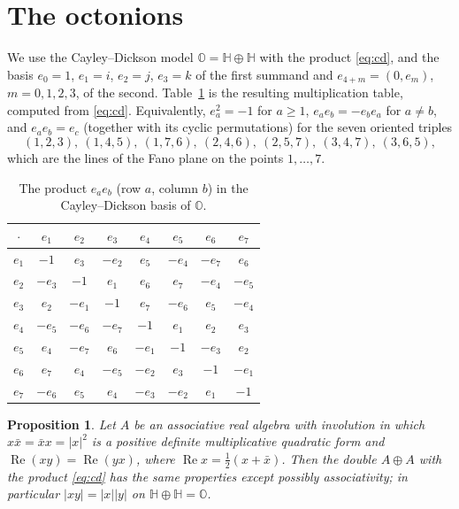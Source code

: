\documentclass[11pt]{amsart}
\numberwithin{equation}{section}
\theoremstyle{plain}
\newtheorem{proposition}[theorem]{Proposition}
\theoremstyle{definition}
\theoremstyle{remark}
\newcommand{\Hq}{\mathbb{H}}
\newcommand{\Oc}{\mathbb{O}}
\renewcommand{\Re}{\operatorname{Re}}
\begin{document}
\section{The octonions}\label{app:octonions}

We use the Cayley--Dickson model $\Oc=\Hq\oplus\Hq$ with the product \eqref{eq:cd}, and the basis $e_0=1$, $e_1=i$, $e_2=j$, $e_3=k$ of the first summand and $e_{4+m}=(0,e_m)$, $m=0,1,2,3$, of the second. Table~\ref{tab:octonions} is the resulting multiplication table, computed from \eqref{eq:cd}. Equivalently, $e_a^2=-1$ for $a\ge1$, $e_ae_b=-e_be_a$ for $a\neq b$, and $e_ae_b=e_c$ (together with its cyclic permutations) for the seven oriented triples
\[
(1,2,3),\ (1,4,5),\ (1,7,6),\ (2,4,6),\ (2,5,7),\ (3,4,7),\ (3,6,5),
\]
which are the lines of the Fano plane on the points $1,\dots,7$.

\begin{table}[ht]
\centering
\small
\begin{tabular}{@{}c|ccccccc@{}}
\toprule
$\cdot$ & $e_1$ & $e_2$ & $e_3$ & $e_4$ & $e_5$ & $e_6$ & $e_7$\\
\midrule
$e_1$ & $-1$ & $e_3$ & $-e_2$ & $e_5$ & $-e_4$ & $-e_7$ & $e_6$\\
$e_2$ & $-e_3$ & $-1$ & $e_1$ & $e_6$ & $e_7$ & $-e_4$ & $-e_5$\\
$e_3$ & $e_2$ & $-e_1$ & $-1$ & $e_7$ & $-e_6$ & $e_5$ & $-e_4$\\
$e_4$ & $-e_5$ & $-e_6$ & $-e_7$ & $-1$ & $e_1$ & $e_2$ & $e_3$\\
$e_5$ & $e_4$ & $-e_7$ & $e_6$ & $-e_1$ & $-1$ & $-e_3$ & $e_2$\\
$e_6$ & $e_7$ & $e_4$ & $-e_5$ & $-e_2$ & $e_3$ & $-1$ & $-e_1$\\
$e_7$ & $-e_6$ & $e_5$ & $e_4$ & $-e_3$ & $-e_2$ & $e_1$ & $-1$\\
\bottomrule
\end{tabular}
\caption{The product $e_ae_b$ (row $a$, column $b$) in the Cayley--Dickson basis of $\Oc$.}
\label{tab:octonions}
\end{table}

\begin{proposition}\label{prop:composition-norm}
Let $A$ be an associative real algebra with involution in which $x\bar x=\bar xx=|x|^2$ is a positive definite multiplicative quadratic form and $\Re(xy)=\Re(yx)$, where $\Re x=\frac12(x+\bar x)$. Then the double $A\oplus A$ with the product \eqref{eq:cd} has the same properties except possibly associativity; in particular $|xy|=|x||y|$ on $\Hq\oplus\Hq=\Oc$.
\end{proposition}
\end{document}
